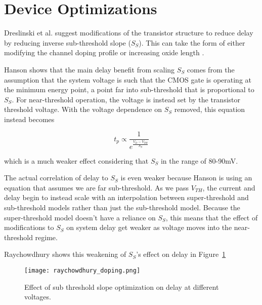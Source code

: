 \section{Device Optimizations}
\label{sec:deviceoptimization}

Dreslinski et al. \cite{Dreslinski:2010ez} suggest modifications of the transistor structure to reduce delay by reducing inverse sub-threshold slope ($S_S$). 
This can take the form of either modifying the channel doping profile \cite{Paul:2004cx} or increasing oxide length \cite{Hanson:2007uu}.

Hanson shows that the main delay benefit from scaling $S_S$ comes from the assumption that the system voltage is such that the CMOS gate is operating at the minimum energy point, a point far into sub-threshold that is proportional to $S_S$. 
For near-threshold operation, the voltage is instead set by the transistor threshold voltage. 
With the voltage dependence on $S_S$ removed, this equation instead becomes

\begin{equation}
t_p \propto \frac{1}{e^\frac{V_{D}-V_{TH}}{S_S}}
\end{equation} 

which is a much weaker effect considering that $S_S$ in the range of 80-90mV. 

The actual correlation of delay to $S_S$ is even weaker because Hanson is using an equation that assumes we are far sub-threshold. 
As we pass $V_{TH}$, the current and delay begin to instead scale with an interpolation between super-threshold and sub-threshold models rather than just the sub-threshold model. 
Because the super-threshold model doesn't have a reliance on $S_S$, this means that the effect of modifications to $S_S$ on system delay get weaker as voltage moves into the near-threshold regime.

 Raychowdhury \cite{Raychowdhury:2006fu} shows this weakening of $S_S$'s effect on delay in Figure~\ref{fig:doping}
  
\begin{figure}[thpb]
    \centering
    \texttt{[image: raychowdhury\_doping.png]}
    \caption{Effect of sub threshold slope optimization on delay at different voltages.~\cite{Raychowdhury:2006fu}}
    \label{fig:doping}
\end{figure}
 
